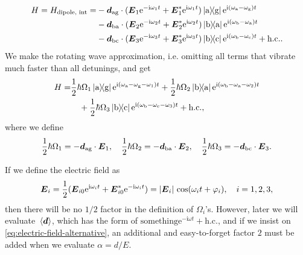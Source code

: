 \documentclass[hyperref, a4paper]{article}
\newcommand*{\ii}{\mathrm{i}}
\newcommand*{\ee}{\mathrm{e}}
\begin{document}
\begin{itemize}
\begin{equation}
    \begin{aligned}
        H = H_\text{dipole, int} = &-  \vb*{d}_\text{ag} \cdot (\vb*{E}_1 \ee^{- \ii \omega_1 t} + \vb*{E}_1^* \ee^{\ii \omega_1 t}) \dyad*{\text{a}}{\text{g}} \ee^{\ii (\omega_\text{a} - \omega_\text{g}) t} \\
        &- \vb*{d}_\text{ba} \cdot (\vb*{E}_2 \ee^{- \ii \omega_2 t} + \vb*{E}_2^* \ee^{ \ii \omega_2 t}) \dyad*{\text{b}}{\text{a}} \ee^{\ii (\omega_\text{b} - \omega_\text{a}) t} \\
        & - \vb*{d}_\text{bc} \cdot (\vb*{E}_3 \ee^{- \ii \omega_3 t } + \vb*{E}_3^* \ee^{ \ii \omega_3 t }) \dyad*{\text{b}}{\text{c}} \ee^{\ii (\omega_\text{b} - \omega_\text{c}) t} + \text{h.c.}.
    \end{aligned}
\end{equation}  
We make the rotating wave approximation, i.e. omitting all terms that vibrate much faster than all detunings, 
and get 
\begin{equation}
    \begin{aligned}
        H = & \frac{1}{2} \hbar \Omega_1 \dyad*{\text{a}}{\text{g}} \ee^{\ii (\omega_\text{a} - \omega_\text{g} - \omega_1) t} 
        + \frac{1}{2} \hbar \Omega_2 \dyad*{\text{b}}{\text{a}} \ee^{\ii (\omega_\text{b} - \omega_\text{a} - \omega_2 ) t} \\
        &\quad + \frac{1}{2} \hbar \Omega_3  \dyad*{\text{b}}{\text{c}} \ee^{\ii (\omega_\text{b} - \omega_\text{c} - \omega_3) t} + \text{h.c.},
    \end{aligned}
\end{equation}
where we define 
\begin{equation}
    \frac{1}{2} \hbar \Omega_1 = - \vb*{d}_\text{ag} \cdot \vb*{E}_1, \quad \frac{1}{2} \hbar \Omega_2 = - \vb*{d}_\text{ba} \cdot \vb*{E}_2,
    \quad \frac{1}{2} \hbar \Omega_3 = - \vb*{d}_\text{bc} \cdot \vb*{E}_3.
\end{equation}

\begin{warning*}{}{}
    If we define the electric field as 
    \begin{equation}
        \vb*{E}_i = \frac{1}{2} (\vb*{E}_{i0} \ee^{\ii \omega_i t } + \vb*{E}_{i0}^* \ee^{- \ii \omega_i t}) = \abs*{\vb*{E}_i} \cos(\omega_i t + \varphi_i), \quad i = 1, 2, 3,
        \label{eq:electric-field-alternative}
    \end{equation}
    then there will be no $1/2$ factor in the definition of $\Omega_i$'s. However, later we will evaluate $\expval*{\vb*{d}}$, which has the form of $\text{something} \ee^{- \ii \omega t} + \text{h.c.}$, and if we insist 
    on \eqref{eq:electric-field-alternative}, an additional and easy-to-forget factor $2$ must be added when we 
    evaluate $\alpha = d / E$. 
\end{warning*}


\end{itemize}
\end{document}
